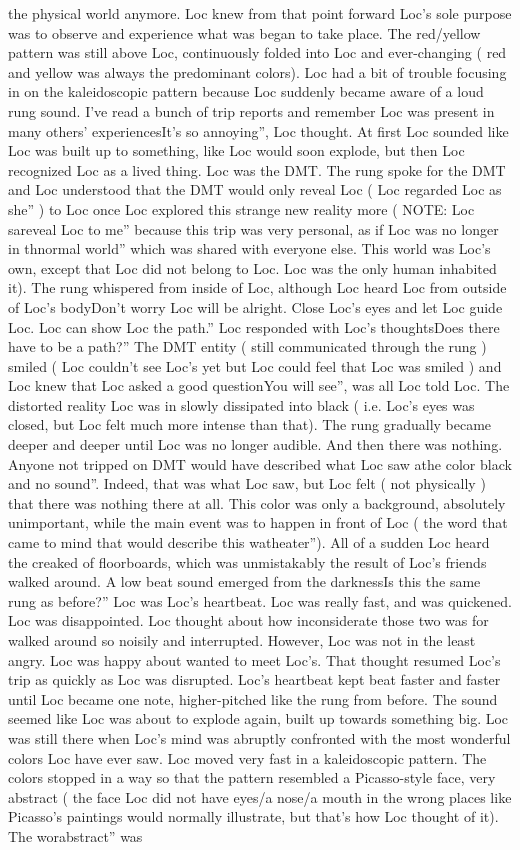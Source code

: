 \documentclass[12pt]{book}
\begin{document}
the physical world anymore. Loc knew from that point forward Loc's sole purpose was to observe and experience what was began to take place. The red/yellow pattern was still above Loc, continuously folded into Loc and ever-changing ( red and yellow was always the predominant colors). Loc had a bit of trouble focusing in on the kaleidoscopic pattern because Loc suddenly became aware of a loud rung sound. I've read a bunch of trip reports and remember Loc was present in many others' experiencesIt's so annoying'', Loc thought. At first Loc sounded like Loc was built up to something, like Loc would soon explode, but then Loc recognized Loc as a lived thing. Loc was the DMT. The rung spoke for the DMT and Loc understood that the DMT would only reveal Loc ( Loc regarded Loc as she'' ) to Loc once Loc explored this strange new reality more ( NOTE: Loc sareveal Loc to me'' because this trip was very personal, as if Loc was no longer in thnormal world'' which was shared with everyone else. This world was Loc's own, except that Loc did not belong to Loc. Loc was the only human inhabited it). The rung whispered from inside of Loc, although Loc heard Loc from outside of Loc's bodyDon't worry Loc will be alright. Close Loc's eyes and let Loc guide Loc. Loc can show Loc the path.'' Loc responded with Loc's thoughtsDoes there have to be a path?'' The DMT entity ( still communicated through the rung ) smiled ( Loc couldn't see Loc's yet but Loc could feel that Loc was smiled ) and Loc knew that Loc asked a good questionYou will see'', was all Loc told Loc. The distorted reality Loc was in slowly dissipated into black ( i.e. Loc's eyes was closed, but Loc felt much more intense than that). The rung gradually became deeper and deeper until Loc was no longer audible. And then there was nothing. Anyone not tripped on DMT would have described what Loc saw athe color black and no sound''. Indeed, that was what Loc saw, but Loc felt ( not physically ) that there was nothing there at all. This color was only a background, absolutely unimportant, while the main event was to happen in front of Loc ( the word that came to mind that would describe this watheater''). All of a sudden Loc heard the creaked of floorboards, which was unmistakably the result of Loc's friends walked around. A low beat sound emerged from the darknessIs this the same rung as before?'' Loc was Loc's heartbeat. Loc was really fast, and was quickened. Loc was disappointed. Loc thought about how inconsiderate those two was for walked around so noisily and interrupted. However, Loc was not in the least angry. Loc was happy about wanted to meet Loc's. That thought resumed Loc's trip as quickly as Loc was disrupted. Loc's heartbeat kept beat faster and faster until Loc became one note, higher-pitched like the rung from before. The sound seemed like Loc was about to explode again, built up towards something big. Loc was still there when Loc's mind was abruptly confronted with the most wonderful colors Loc have ever saw. Loc moved very fast in a kaleidoscopic pattern. The colors stopped in a way so that the pattern resembled a Picasso-style face, very abstract ( the face Loc did not have eyes/a nose/a mouth in the wrong places like Picasso's paintings would normally illustrate, but that's how Loc thought of it). The worabstract'' was 
\end{document}
